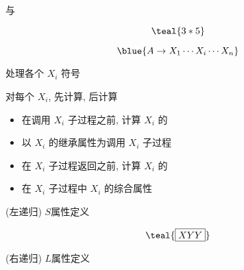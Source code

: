 \begin{frame}{}
  \begin{center}
     与 

    \vspace{0.30cm}
    \vspace{-0.20cm}
    \[
      \teal{3 \ast 5}
    \]

    \pause
    \vspace{-0.50cm}
    \[
      \blue{A \to X_{1} \cdots X_{i} \cdots X_{n}}
    \]

     处理各个 $X_{i}$ 符号

    \vspace{0.10cm}
    对每个 $X_{i}$, 先计算, 后计算
  \end{center}
\end{frame}

\begin{frame}{}
  \begin{center}

    \vspace{0.80cm}
    \begin{itemize}
      \centering
      \setlength{\itemsep}{15pt}
      \item 在调用 $X_{i}$ 子过程之前, 计算 $X_{i}$ 的
      \item 以 $X_{i}$ 的继承属性为调用 $X_{i}$ 子过程
      \item 在 $X_{i}$ 子过程返回之前, 计算 $X_{i}$ 的
      \item 在 $X_{i}$ 子过程中 $X_{i}$ 的综合属性
    \end{itemize}
  \end{center}
\end{frame}

\begin{frame}{}
  \begin{center}
    (左递归) $S$属性定义
    \vspace{-0.50cm}
    

    \vspace{-0.60cm}
    \[
      \teal{\boxed{X Y Y}}
    \]

    (右递归) $L$属性定义
    \vspace{-0.50cm}
    
  \end{center}
\end{frame}

